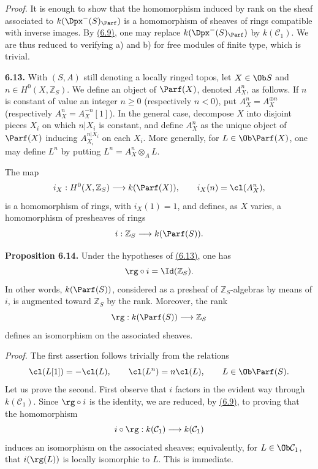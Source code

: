 \providecommand{\End}{\operatorname{End}}
\providecommand{\tr}{\operatorname{tr}}

\emph{Proof.} It is enough to show that the homomorphism induced by rank on the sheaf associated to \(k(\Dpx^-(S)_{\Parf})\) is a homomorphism of sheaves of rings compatible with inverse images. By \hyperlink{sga6.e01.para.6-9}{(6.9)}, one may replace \(k(\Dpx^-(S)_{\Parf})\) by \(k(\mathcal C_1)\). We are thus reduced to verifying a) and b) for free modules of finite type, which is trivial.

\textbf{6.13.} With \((S,A)\) still denoting a locally ringed topos, let \(X\in\Ob S\) and \(n\in H^0(X,\mathbb Z_S)\). We define an object of \(\Parf(X)\), denoted \(A_X^n\), as follows. If \(n\) is constant of value an integer \(n\geq0\) (respectively \(n<0\)), put \(A_X^n=A_X^{\oplus n}\) (respectively \(A_X^n=A_X^{-n}[1]\)). In the general case, decompose \(X\) into disjoint pieces \(X_i\) on which \(n|X_i\) is constant, and define \(A_X^n\) as the unique object of \(\Parf(X)\) inducing \(A_{X_i}^{n|X_i}\) on each \(X_i\). More generally, for \(L\in\Ob\Parf(X)\), one may define \(L^n\) by putting \(L^n=A_X^n\otimes_A L\).

The map
\[
  i_X:H^0(X,\mathbb Z_S)\longrightarrow k(\Parf(X)),
  \qquad i_X(n)=\cl(A_X^n),
\]
is a homomorphism of rings, with \(i_X(1)=1\), and defines, as \(X\) varies, a homomorphism of presheaves of rings
\[
  i:\mathbb Z_S\longrightarrow k(\Parf(S)).
\]

\textbf{Proposition 6.14.} Under the hypotheses of \hyperlink{sga6.e01.para.6-13}{(6.13)}, one has
\[
  \rg\circ i=\Id(\mathbb Z_S).
\]
In other words, \(k(\Parf(S))\), considered as a presheaf of \(\mathbb Z_S\)-algebras by means of \(i\), is augmented toward \(\mathbb Z_S\) by the rank. Moreover, the rank
\[
  \rg:k(\Parf(S))\longrightarrow \mathbb Z_S
\]
defines an isomorphism on the associated sheaves.

\emph{Proof.} The first assertion follows trivially from the relations
\[
  \cl(L[1])=-\cl(L),\qquad \cl(L^n)=n\cl(L),
  \qquad L\in\Ob\Parf(S).
\]
Let us prove the second. First observe that \(i\) factors in the evident way through \(k(\mathcal C_1)\). Since \(\rg\circ i\) is the identity, we are reduced, by \hyperlink{sga6.e01.para.6-9}{(6.9)}, to proving that the homomorphism
\[
  i\circ\rg:k(\mathcal C_1)\longrightarrow k(\mathcal C_1)
\]
induces an isomorphism on the associated sheaves; equivalently, for \(L\in\Ob\mathcal C_1\), that \(i(\rg(L))\) is locally isomorphic to \(L\). This is immediate.

